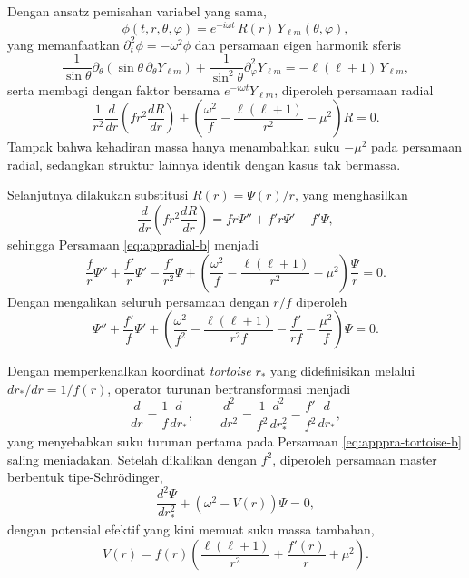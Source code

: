 Dengan ansatz pemisahan variabel yang sama,
\begin{equation}
    \phi(t, r, \theta, \varphi) = e^{-i\omega t}\, R(r)\, Y_{\ell m}(\theta, \varphi),
    \label{eq:appseparasi-b}
\end{equation}
yang memanfaatkan $\partial_t^2 \phi = -\omega^2 \phi$ dan persamaan eigen harmonik
sferis
\begin{equation}
    \frac{1}{\sin\theta} \partial_\theta \left( \sin\theta\, \partial_\theta Y_{\ell m} \right)
    + \frac{1}{\sin^2\theta} \partial_\varphi^2 Y_{\ell m} = -\ell(\ell+1)\, Y_{\ell m},
\end{equation}
serta membagi dengan faktor bersama $e^{-i\omega t} Y_{\ell m}$, diperoleh persamaan radial
\begin{equation}
    \frac{1}{r^2} \frac{d}{dr} \left( f r^2 \frac{dR}{dr} \right)
    + \left( \frac{\omega^2}{f} - \frac{\ell(\ell+1)}{r^2} - \mu^2 \right) R = 0.
    \label{eq:appradial-b}
\end{equation}
Tampak bahwa kehadiran massa hanya menambahkan suku $-\mu^2$ pada persamaan radial,
sedangkan struktur lainnya identik dengan kasus tak bermassa.
 
Selanjutnya dilakukan substitusi $R(r) = \Psi(r)/r$, yang menghasilkan
\begin{equation}
    \frac{d}{dr} \left( f r^2 \frac{dR}{dr} \right)
    = f r \Psi'' + f' r \Psi' - f' \Psi,
\end{equation}
sehingga Persamaan \eqref{eq:appradial-b} menjadi
\begin{equation}
    \frac{f}{r} \Psi'' + \frac{f'}{r} \Psi' - \frac{f'}{r^2} \Psi
    + \left( \frac{\omega^2}{f} - \frac{\ell(\ell+1)}{r^2} - \mu^2 \right) \frac{\Psi}{r} = 0.
\end{equation}
Dengan mengalikan seluruh persamaan dengan $r/f$ diperoleh
\begin{equation}
    \Psi'' + \frac{f'}{f} \Psi'
    + \left( \frac{\omega^2}{f^2} - \frac{\ell(\ell+1)}{r^2 f} - \frac{f'}{r f} - \frac{\mu^2}{f} \right) \Psi = 0.
    \label{eq:apppra-tortoise-b}
\end{equation}
 
Dengan memperkenalkan koordinat \textit{tortoise} $r_*$ yang didefinisikan melalui
$dr_*/dr = 1/f(r)$, operator turunan bertransformasi menjadi
\begin{equation}
    \frac{d}{dr} = \frac{1}{f} \frac{d}{dr_*}, \qquad
    \frac{d^2}{dr^2} = \frac{1}{f^2} \frac{d^2}{dr_*^2} - \frac{f'}{f^2} \frac{d}{dr_*},
\end{equation}
yang menyebabkan suku turunan pertama pada Persamaan \eqref{eq:apppra-tortoise-b}
saling meniadakan. Setelah dikalikan dengan $f^2$, diperoleh persamaan master
berbentuk tipe-Schrödinger,
\begin{equation}
    \frac{d^2 \Psi}{dr_*^2} + \left( \omega^2 - V(r) \right) \Psi = 0,
    \label{eq:appmaster-b}
\end{equation}
dengan potensial efektif yang kini memuat suku massa tambahan,
\begin{equation}
    V(r) = f(r) \left( \frac{\ell(\ell+1)}{r^2} + \frac{f'(r)}{r} + \mu^2 \right).
    \label{eq:apppotensial-b}
\end{equation}
 
